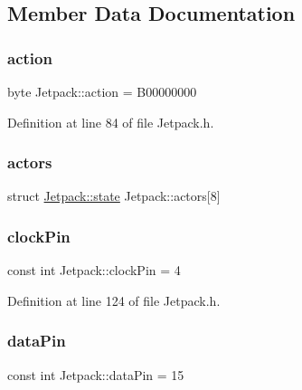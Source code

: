 \subsection{Member Data Documentation}
\mbox{\label{class_jetpack_aca3142925a7b0834b34ae91d26af7765}} 
\subsubsection{\texorpdfstring{action}{action}}
{\footnotesize\ttfamily byte Jetpack\+::action = B00000000\hspace{0.3cm}{\ttfamily [private]}}



Definition at line 84 of file Jetpack.\+h.

\mbox{\label{class_jetpack_a7e16d2f97837f9712a2e6de1c50d99db}} 
\subsubsection{\texorpdfstring{actors}{actors}}
{\footnotesize\ttfamily struct \hyperlink{struct_jetpack_1_1state}{Jetpack\+::state} Jetpack\+::actors\mbox{[}8\mbox{]}\hspace{0.3cm}{\ttfamily [private]}}

\mbox{\label{class_jetpack_a58ebb991f358f3ae94e82148b0221b5a}} 
\subsubsection{\texorpdfstring{clock\+Pin}{clockPin}}
{\footnotesize\ttfamily const int Jetpack\+::clock\+Pin = 4\hspace{0.3cm}{\ttfamily [private]}}



Definition at line 124 of file Jetpack.\+h.

\mbox{\label{class_jetpack_a3d669a56e93c71dd25f970d4ed7d0c00}} 
\subsubsection{\texorpdfstring{data\+Pin}{dataPin}}
{\footnotesize\ttfamily const int Jetpack\+::data\+Pin = 15\hspace{0.3cm}{\ttfamily [private]}}



